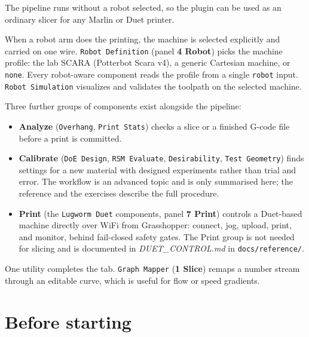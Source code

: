 \documentclass[11pt]{article}
\newcommand{\param}[1]{\texttt{#1}}
\begin{document}
The pipeline runs without a robot selected, so the plugin can be used
as an ordinary slicer for any Marlin or Duet printer.

When a robot arm does the printing, the machine is selected explicitly
and carried on one wire. \param{Robot Definition} (panel
\textbf{4 Robot}) picks the machine profile: the lab SCARA (Potterbot
Scara v4), a generic Cartesian machine, or \param{none}. Every
robot-aware component reads the profile from a single \param{robot}
input. \param{Robot Simulation} visualizes and validates the
toolpath on the selected machine.

Three further groups of components exist alongside the pipeline:

\begin{itemize}
  \item \textbf{Analyze} (\param{Overhang}, \param{Print Stats}) checks a slice or a finished G-code file before a print is committed.
  \item \textbf{Calibrate} (\param{DoE Design}, \param{RSM Evaluate}, \param{Desirability}, \param{Test Geometry}) finds settings for a new material with designed experiments rather than trial and error. The workflow is an advanced topic and is only summarised here; the reference and the exercises describe the full procedure.
  \item \textbf{Print} (the \param{Lugworm Duet} components, panel \textbf{7 Print}) controls a Duet-based machine directly over WiFi from Grasshopper: connect, jog, upload, print, and monitor, behind fail-closed safety gates. The Print group is not needed for slicing and is documented in \emph{DUET\_CONTROL.md} in \texttt{docs/reference/}.
\end{itemize}

One utility completes the tab. \param{Graph Mapper}
(\textbf{1 Slice}) remaps a number stream through an editable curve,
which is useful for flow or speed gradients.

\section{Before starting}
\end{document}
